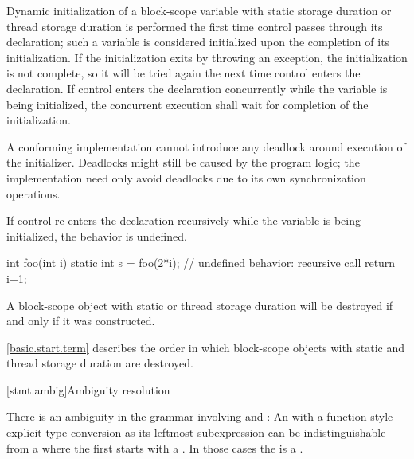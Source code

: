 \pnum
{}%
%
%
%
Dynamic initialization of a block-scope variable with
static storage duration or
thread storage duration is performed
the first time control passes through its declaration; such a variable is
considered initialized upon the completion of its initialization. If the
initialization exits by throwing an exception, the initialization is not
complete, so it will be tried again the next time control enters the
declaration.
If control enters the declaration concurrently while the variable is
being initialized, the concurrent execution shall wait for completion
of the initialization.
\begin{note}
A conforming implementation cannot introduce
any deadlock around execution of the initializer.
Deadlocks might still be caused by the program logic;
the implementation need only avoid deadlocks
due to its own synchronization operations.
\end{note}
If control
re-enters the declaration recursively while
the variable is being initialized, the behavior is undefined.
\begin{example}
\begin{codeblock}
int foo(int i) {
  static int s = foo(2*i);      // undefined behavior: recursive call
  return i+1;
}
\end{codeblock}
\end{example}

\pnum
{}%
A block-scope object with static or thread storage duration will be
destroyed if and only if it was constructed.
\begin{note}
\ref{basic.start.term} describes the order in which block-scope objects with
static and thread storage duration are destroyed.
\end{note}

[stmt.ambig]{Ambiguity resolution}%

\pnum
There is an ambiguity in the grammar involving
 and : An
 with a function-style explicit type
conversion as its leftmost subexpression can be
indistinguishable from a  where the first
 starts with a \tcode{(}. In those cases the
 is a .


